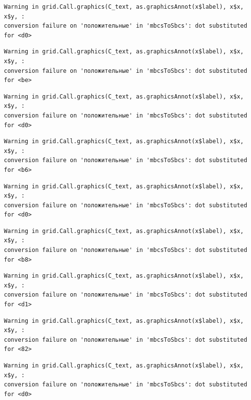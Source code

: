 \documentclass[
  letterpaper,
]{scrbook}
\theoremstyle{definition}
\theoremstyle{remark}
\begin{document}
\begin{verbatim}
Warning in grid.Call.graphics(C_text, as.graphicsAnnot(x$label), x$x, x$y, :
conversion failure on 'положительные' in 'mbcsToSbcs': dot substituted for <d0>
\end{verbatim}

\begin{verbatim}
Warning in grid.Call.graphics(C_text, as.graphicsAnnot(x$label), x$x, x$y, :
conversion failure on 'положительные' in 'mbcsToSbcs': dot substituted for <be>
\end{verbatim}

\begin{verbatim}
Warning in grid.Call.graphics(C_text, as.graphicsAnnot(x$label), x$x, x$y, :
conversion failure on 'положительные' in 'mbcsToSbcs': dot substituted for <d0>
\end{verbatim}

\begin{verbatim}
Warning in grid.Call.graphics(C_text, as.graphicsAnnot(x$label), x$x, x$y, :
conversion failure on 'положительные' in 'mbcsToSbcs': dot substituted for <b6>
\end{verbatim}

\begin{verbatim}
Warning in grid.Call.graphics(C_text, as.graphicsAnnot(x$label), x$x, x$y, :
conversion failure on 'положительные' in 'mbcsToSbcs': dot substituted for <d0>
\end{verbatim}

\begin{verbatim}
Warning in grid.Call.graphics(C_text, as.graphicsAnnot(x$label), x$x, x$y, :
conversion failure on 'положительные' in 'mbcsToSbcs': dot substituted for <b8>
\end{verbatim}

\begin{verbatim}
Warning in grid.Call.graphics(C_text, as.graphicsAnnot(x$label), x$x, x$y, :
conversion failure on 'положительные' in 'mbcsToSbcs': dot substituted for <d1>
\end{verbatim}

\begin{verbatim}
Warning in grid.Call.graphics(C_text, as.graphicsAnnot(x$label), x$x, x$y, :
conversion failure on 'положительные' in 'mbcsToSbcs': dot substituted for <82>
\end{verbatim}

\begin{verbatim}
Warning in grid.Call.graphics(C_text, as.graphicsAnnot(x$label), x$x, x$y, :
conversion failure on 'положительные' in 'mbcsToSbcs': dot substituted for <d0>
\end{verbatim}
\end{document}
